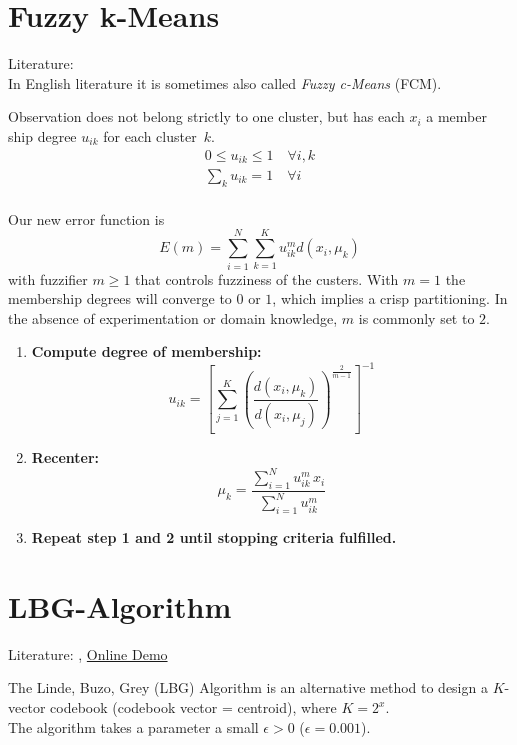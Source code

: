 \section{Fuzzy k-Means}\label{sec:fuzzy-kmeans}
Literature: \cite{Introduction2000}\\
In English literature it is sometimes also called \emph{Fuzzy c-Means} (FCM).

Observation does not belong strictly to one cluster, but has each $x_i$ a member ship degree $u_{ik}$ for each cluster~$k$.
\begin{align}
0 \leq u_{ik} \leq 1 \quad \forall i, k\\
\sum_k u_{ik} = 1 \quad \forall i\\
\end{align}

Our new error function is
\begin{equation}\label{eq:fuzzy-kmeans-error}
E(m) = \sum_{i=1}^N \sum_{k=1}^K u_{ik}^m d(x_i, \mu_k)
\end{equation}
with fuzzifier $m \geq 1$ that controls fuzziness of the custers. With $m=1$ the membership degrees will converge to $0$ or $1$, which implies a crisp partitioning. In the absence of experimentation or domain knowledge, $m$ is commonly set to $2$.

\begin{enumerate}
\item \textbf{Compute degree of membership:}
	$$u_{ik} = \left[ \sum_{j=1}^K \left( \frac{d(x_i, \mu_k)}{d(x_i, \mu_j)} \right)^{\frac{2}{m-1}} \right]^{-1}$$
\item \textbf{Recenter:}
	$$\mu_k = \frac{\sum_{i=1}^N u_{ik}^m \, x_i}{\sum_{i=1}^N u_{ik}^m}$$
\item \textbf{Repeat step 1 and 2 until stopping criteria fulfilled.}
\end{enumerate}

\section{LBG-Algorithm}
Literature: \cite{Linde1980}, \href{http://www.data-compression.com/vqanim.shtml}{Online Demo}

The Linde, Buzo, Grey (LBG) Algorithm is an alternative method to design a $K$-vector codebook (codebook vector = centroid), where $K=2^x$.\\
The algorithm takes a parameter a small $\epsilon > 0$ (\eg $\epsilon=0.001$).

